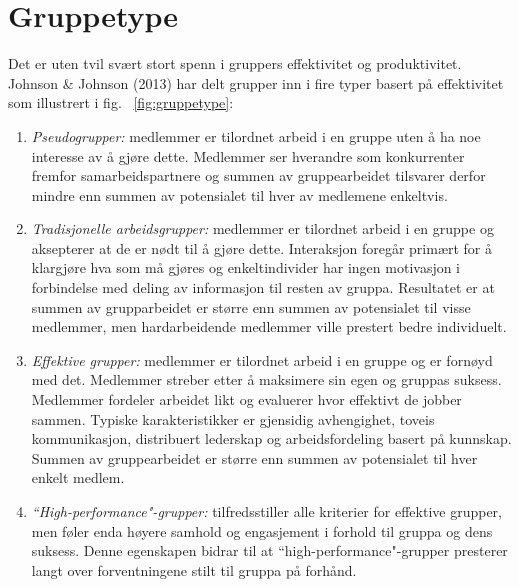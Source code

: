 \section{Gruppetype}
\label{sec:gruppetype}
Det er uten tvil svært stort spenn i gruppers effektivitet og produktivitet. Johnson \& Johnson (2013) \cite{gruppeteori} har delt grupper inn i fire typer basert på effektivitet som illustrert i fig. ~\ref{fig:gruppetype}:
\begin{enumerate}
\item \textit{Pseudogrupper:} medlemmer er tilordnet arbeid i en gruppe uten å ha noe interesse av å gjøre dette. Medlemmer ser hverandre som konkurrenter fremfor samarbeidspartnere og summen av gruppearbeidet tilsvarer derfor mindre enn summen av potensialet til hver av medlemene enkeltvis. \cite{gruppeteori}
\item \textit{Tradisjonelle arbeidsgrupper:} medlemmer er tilordnet arbeid i en gruppe og aksepterer at de er nødt til å gjøre dette. Interaksjon foregår primært for å klargjøre hva som må gjøres og enkeltindivider har ingen motivasjon i forbindelse med deling av informasjon til resten av gruppa. Resultatet er at summen av grupparbeidet er større enn summen av potensialet til visse medlemmer, men hardarbeidende medlemmer ville prestert bedre individuelt. \cite{gruppeteori}

\item \textit{Effektive grupper:} medlemmer er tilordnet arbeid i en gruppe og er fornøyd med det. Medlemmer streber etter å maksimere sin egen og gruppas suksess. Medlemmer fordeler arbeidet likt og evaluerer hvor effektivt de jobber sammen. Typiske karakteristikker er gjensidig avhengighet, toveis kommunikasjon, distribuert lederskap og arbeidsfordeling basert på kunnskap. Summen av gruppearbeidet er større enn summen av potensialet til hver enkelt medlem. \cite{gruppeteori}

\item \textit{``High-performance"-grupper:} tilfredsstiller alle kriterier for effektive grupper, men føler enda høyere samhold og engasjement i forhold til gruppa og dens suksess. Denne egenskapen bidrar til at ``high-performance"-grupper presterer langt over forventningene stilt til gruppa på forhånd. \cite{gruppeteori}


\end{enumerate}
